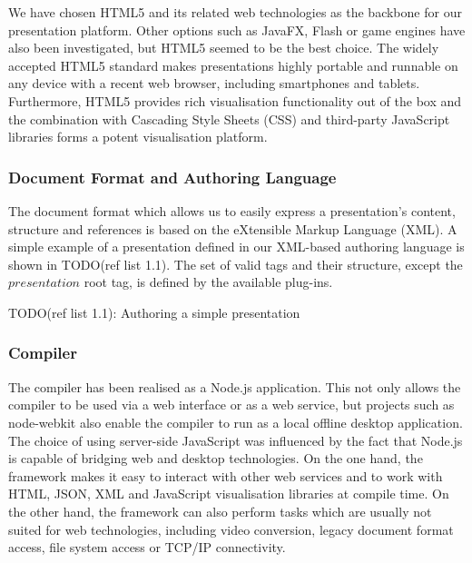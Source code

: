 \documentclass[a4paper,12pt]{report}
\begin{document}
    We have chosen HTML5 and its related web technologies as the backbone for
    our \mxp presentation platform. Other options such as JavaFX, Flash or game
    engines have also been investigated, but HTML5 seemed to be the best choice.
    The widely accepted HTML5 standard makes \mxp presentations highly portable and
    runnable on any device with a recent web browser, including smartphones and
    tablets. Furthermore, HTML5 provides rich visualisation functionality out of
    the box and the combination with Cascading Style Sheets
    (CSS) and third-party JavaScript libraries forms a potent visualisation
    platform.

    \subsubsection{Document Format and Authoring Language}

     The \mxp document format which allows us to easily express a
     presentation's content, structure and references is based on the
     eXtensible Markup Language (XML). A simple example of a presentation
     defined in our XML-based authoring language is shown in TODO(ref list
     1.1). The set of valid tags and their structure, except the $presentation$
     root tag, is defined by the available plug-ins.

     TODO(ref list 1.1): Authoring a simple \mxp presentation

    \subsubsection{Compiler}

     The compiler has been realised as a Node.js application. This not only
     allows the compiler to be used via a web interface or as a web service,
     but projects such as node-webkit also enable the compiler to run as a
     local offline desktop application. The choice of using server-side
     JavaScript was influenced by the fact that Node.js is capable of bridging
     web and desktop technologies. On the one hand, the framework makes it easy
     to interact with other web services and to work with HTML, JSON, XML and
     JavaScript visualisation libraries at compile time. On the other hand, the
     framework can also perform tasks which are usually not suited for web
     technologies, including video conversion, legacy document format access,
     file system access or TCP/IP connectivity.
\end{document}
